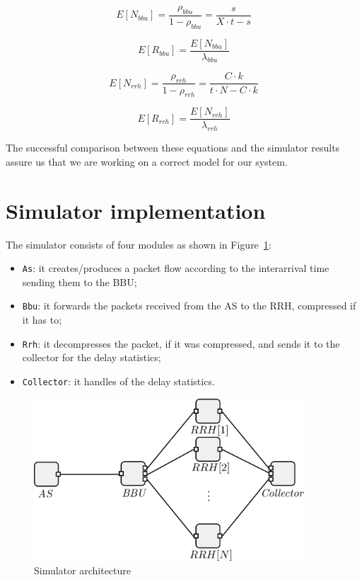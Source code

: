 \documentclass[11pt,a4paper,oneside, openright]{article}
\begin{document}
$$ E[N_{bbu}] = \frac{\rho_{bbu}}{1 - \rho_{bbu}} = \frac{s}{X \cdot t - s}$$

$$ E[R_{bbu}] = \frac{E[N_{bbu}]}{\lambda_{bbu}} $$

$$ E[N_{rrh}] = \frac{\rho_{rrh}}{1 - \rho_{rrh}} = \frac{C \cdot k}{t \cdot N - C \cdot k}$$

$$ E[R_{rrh}] = \frac{E[N_{rrh}]}{\lambda_{rrh}} $$

The successful comparison between these equations and the simulator results assure us that we are working on a correct model for our system.

\section{Simulator implementation}
The simulator consists of four modules as shown in Figure~\ref{fig:simulator}:
\begin{itemize}
  \item \texttt{As}: it creates/produces a packet flow according to the interarrival time sending them to the BBU;
  \item \texttt{Bbu}: it forwards the packets received from the AS to the RRH, compressed if it has to;
  \item \texttt{Rrh}: it decompresses the packet, if it was compressed, and sends it to the collector for the delay statistics;
  \item \texttt{Collector}: it handles of the delay statistics.
\end{itemize}

\begin{figure}[h]
    \centering
    \includegraphics[width=0.9\textwidth]{images/simulator}
    \caption{Simulator architecture}
    \label{fig:simulator}
\end{figure}
\end{document}
